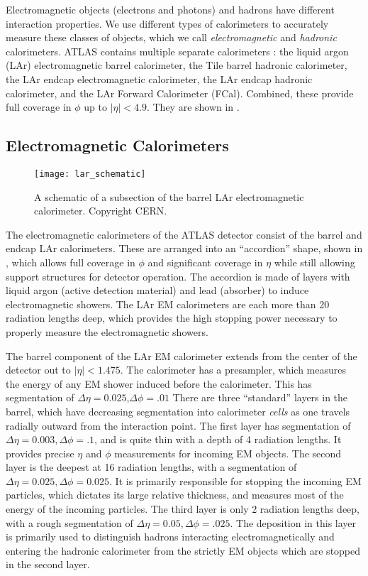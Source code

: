 Electromagnetic objects (electrons and photons) and hadrons have different interaction properties.
We use different types of calorimeters to accurately measure these classes of objects, which we call \textit{electromagnetic} and \textit{hadronic} calorimeters.
ATLAS contains multiple separate calorimeters : the liquid argon (LAr) electromagnetic barrel calorimeter, the Tile barrel hadronic calorimeter, the LAr endcap electromagnetic calorimeter, the LAr endcap hadronic calorimeter, and the LAr Forward Calorimeter (FCal).
Combined, these provide full coverage in $\phi$ up to $|\eta| <4.9$.
They are shown in .

\subsection{Electromagnetic Calorimeters}
\begin{figure}
\caption{A schematic of a subsection of the barrel LAr electromagnetic calorimeter. Copyright CERN.} \label{fig:lar_schematic}
\texttt{[image: lar\_schematic]}
\end{figure}

The electromagnetic calorimeters of the ATLAS detector consist of the barrel and endcap LAr calorimeters.
These are arranged into an ``accordion'' shape, shown in , which allows full coverage in $\phi$ and significant coverage in $\eta$ while still allowing support structures for detector operation.
The accordion is made of layers with liquid argon (active detection material) and lead (absorber) to induce electromagnetic showers.
The LAr EM calorimeters are each more than 20 radiation lengths deep, which provides the high stopping power necessary to properly measure the electromagnetic showers.

The barrel component of the LAr EM calorimeter extends from the center of the detector out to $| \eta| <  1.475 $.
The calorimeter has a presampler, which measures the energy of any EM shower induced before the calorimeter.
This has segmentation of $\Delta\eta = 0.025$,$ \Delta\phi = .01$
There are three ``standard'' layers in the barrel, which have decreasing segmentation into calorimeter \textit{cells} as one travels radially outward from the interaction point.
The first layer has segmentation of $\Delta\eta = 0.003, \Delta\phi = .1$, and is quite thin with a depth of 4 radiation lengths.
It provides precise $\eta$ and $\phi$ measurements for incoming EM objects.
The second layer is the deepest at 16 radiation lengths, with a segmentation of $\Delta\eta = 0.025, \Delta\phi = 0.025$.
It is primarily responsible for stopping the incoming EM particles, which dictates its large relative thickness, and measures most of the energy of the incoming particles.
The third layer is only 2 radiation lengths deep, with a rough segmentation of $\Delta\eta = 0.05, \Delta\phi = .025$.
The deposition in this layer is primarily used to distinguish hadrons interacting electromagnetically and entering the hadronic calorimeter from the strictly EM objects which are stopped in the second layer.

